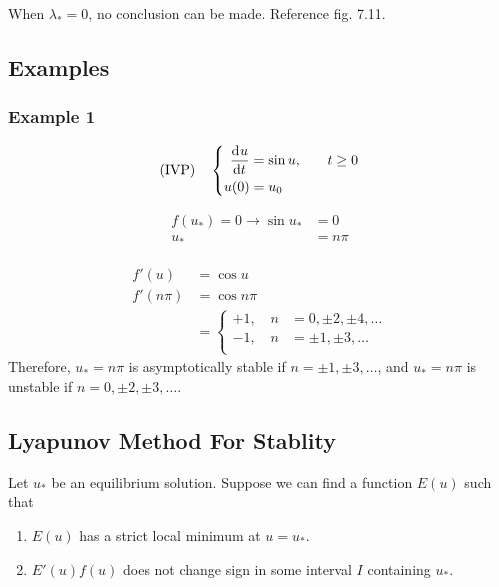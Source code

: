 \documentclass[12pt,twoside]{article}
\begin{document}
When $\lambda_*=0$, no conclusion can be made. Reference fig. 7.11.

\subsection{Examples}
\subsubsection*{Example 1}
\begin{equation} \text{(IVP)} \quad
  \left\{
  \begin{aligned}
    \frac{\mathrm{d}^{} {u}}{\mathrm{d}{t}^{}} &= \sin u, &\quad t&\ge 0 \\
    u(0) &= u_0 \\
  \end{aligned} \right.
\end{equation}

\begin{equation}
  \begin{aligned}
    f(u_*) = 0 \rightarrow \sin u_* & = 0 \\
    u_*  &= n\pi \\
  \end{aligned}
\end{equation}

\begin{equation}
  \begin{aligned}
    f'(u) &= \cos u \\
    f'(n\pi) &= \cos n\pi \\
    &= \left\{
    \begin{aligned}
      +1,\quad n&=0,\pm2,\pm4,\ldots \\
      -1,\quad n&=\pm1,\pm3,\ldots \\
    \end{aligned}
    \right.
  \end{aligned}
\end{equation}
Therefore, $u_*=n\pi$ is asymptotically stable if $n=\pm1,\pm3,\ldots$, and
$u_*=n\pi$ is unstable if $n=0,\pm2,\pm3,\ldots$.

\subsection{Lyapunov Method For Stablity}
Let $u_*$ be an equilibrium solution. Suppose we can find a function $E(u)$ such
that
\begin{enumerate}
\item $E(u)$ has a strict local minimum at $u=u_*$.
\item $E'(u)f(u)$ does not change sign in some interval $I$ containing $u_*$.
\end{enumerate}
\end{document}
